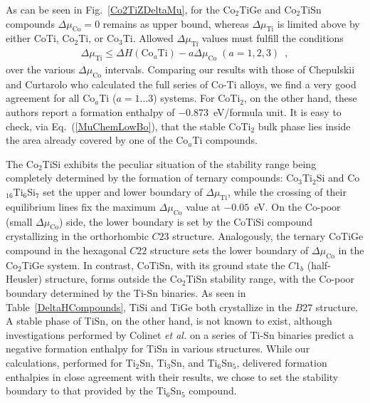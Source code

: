 \documentclass[aps,prb,twocolumn,superscriptaddress,showpacs]{revtex4}
\newcommand{\FG}[1]{Fig.~\ref{#1}}
\newcommand{\EQ}[1]{Eq.~(\ref{#1})}
\newcommand{\ea}{{\it et al.}}
\begin{document}
As can be seen in \FG{Co2TiZDeltaMu}, for the
Co$_2$TiGe and Co$_2$TiSn compounds $\Delta\mu_\text{Co}=0$ 
remains as upper bound, whereas 
$\Delta\mu_\text{Ti}$ is limited above by either 
CoTi, Co$_2$Ti, or Co$_3$Ti. Allowed $\Delta\mu_\text{Ti}$ values must
fulfill the conditions
\begin{equation}
  \label{DMuCoDMuTiUp}
  \begin{aligned}
  \Delta\mu_\text{Ti} \leq \Delta H(\text{Co}_a\text{Ti}) -
  a\Delta\mu_\text{Co}\;(a=1,2,3)\enspace,
  \end{aligned}
\end{equation}
over the various $\Delta\mu_\text{Co}$ intervals.
Comparing our results with those of Chepulskii and
Curtarolo\cite{CC09} who calculated the full series of
Co-Ti alloys, we find a very good agreement 
for all Co$_a$Ti ($a=1\ldots 3$) systems.\cite{CurtaNote}
For CoTi$_2$, on the other hand,
these authors report a formation
enthalpy of $-0.873$~eV/formula unit. It is easy to check,
via \EQ{MuChemLowBo}, 
that the stable CoTi$_2$ bulk phase lies inside the
area already covered by one of the Co$_a$Ti compounds.

The Co$_2$TiSi exhibits the peculiar situation of the
stability range being completely determined by the formation of
ternary compounds: Co$_3$Ti$_2$Si and Co$_{16}$Ti$_6$Si$_7$ set the
upper and lower boundary of $\Delta\mu_\text{Ti}$, while the crossing
of their equilibrium lines fix the maximum $\Delta\mu_\text{Co}$ value
at $-0.05$~eV. On the Co-poor (small $\Delta\mu_\text{Co}$) side,
the lower boundary is set by the CoTiSi compound crystallizing in the
orthorhombic $C23$ structure. 
Analogously, the ternary CoTiGe compound in the hexagonal 
$C22$ structure sets the lower boundary of $\Delta\mu_\text{Co}$ in
the Co$_2$TiGe system. In contrast, CoTiSn, with its ground state the
$C1_b$ (half-Heusler) structure, forms outside the Co$_2$TiSn
stability range, with the Co-poor boundary determined by the
Ti-Sn binaries. As seen in Table~\ref{DeltaHCompounds}, TiSi and TiGe
both crystallize in the $B27$ structure.
A stable phase of TiSn, on the other hand, is not known to exist,
although investigations performed by Colinet \ea\cite{CTF09} on 
a series of Ti-Sn binaries predict a negative formation enthalpy
for TiSn in various structures. 
While our calculations, performed for Ti$_2$Sn, Ti$_3$Sn, and
Ti$_6$Sn$_5$, delivered formation enthalpies 
in close agreement with their results, we chose to set
the stability boundary to that provided by the Ti$_6$Sn$_5$ compound.
\end{document}

